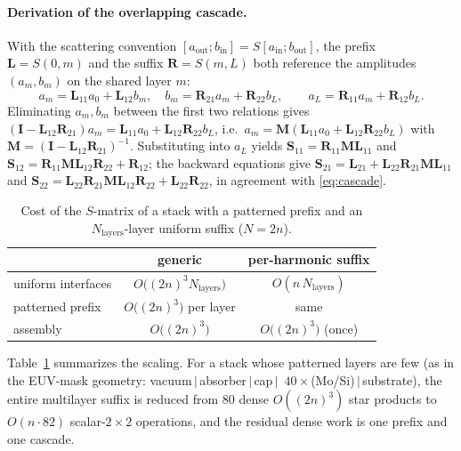 \documentclass[11pt]{article}
\theoremstyle{remark}
\newcommand{\Id}{\mathbf{I}}
\begin{document}
\paragraph{Derivation of the overlapping cascade.}
With the scattering convention $[a_{\mathrm{out}};b_{\mathrm{in}}]=S[a_{\mathrm{in}};b_{\mathrm{out}}]$,
the prefix $\mathbf{L}=S(0,m)$ and the suffix $\mathbf{R}=S(m,L)$ both
reference the amplitudes $(a_m,b_m)$ on the shared layer $m$:
\begin{equation}
a_m=\mathbf{L}_{11}a_0+\mathbf{L}_{12}b_m,\quad
b_m=\mathbf{R}_{21}a_m+\mathbf{R}_{22}b_L,\qquad
a_L=\mathbf{R}_{11}a_m+\mathbf{R}_{12}b_L.
\label{eq:LD}
\end{equation}
Eliminating $a_m,b_m$ between the first two relations gives
$(\Id-\mathbf{L}_{12}\mathbf{R}_{21})a_m=\mathbf{L}_{11}a_0+
\mathbf{L}_{12}\mathbf{R}_{22}b_L$, i.e.\ $a_m=\mathbf{M}(\mathbf{L}_{11}a_0+
\mathbf{L}_{12}\mathbf{R}_{22}b_L)$ with $\mathbf{M}=(\Id-
\mathbf{L}_{12}\mathbf{R}_{21})^{-1}$. Substituting into $a_L$ yields
$\mathbf{S}_{11}=\mathbf{R}_{11}\mathbf{M}\mathbf{L}_{11}$ and
$\mathbf{S}_{12}=\mathbf{R}_{11}\mathbf{M}\mathbf{L}_{12}\mathbf{R}_{22}
+\mathbf{R}_{12}$; the backward equations give
$\mathbf{S}_{21}=\mathbf{L}_{21}+\mathbf{L}_{22}\mathbf{R}_{21}\mathbf{M}\mathbf{L}_{11}$
and $\mathbf{S}_{22}=\mathbf{L}_{22}\mathbf{R}_{21}\mathbf{M}\mathbf{L}_{12}
\mathbf{R}_{22}+\mathbf{L}_{22}\mathbf{R}_{22}$, in agreement with
\eqref{eq:cascade}.

\begin{table}[t]
\centering
\caption{Cost of the $S$-matrix of a stack with a patterned prefix and an
$N_{\mathrm{layers}}$-layer uniform suffix ($N=2n$).}
\label{tab:complexity}
\begin{tabular}{lcc}
\toprule
 & generic & per-harmonic suffix\\
\midrule
uniform interfaces & $O\big((2n)^3 N_{\mathrm{layers}}\big)$ & $O(n\,N_{\mathrm{layers}})$\\
patterned prefix & $O\big((2n)^3\big)$ per layer & same\\
assembly & $O\big((2n)^3\big)$ & $O\big((2n)^3\big)$ (once)\\
\bottomrule
\end{tabular}
\end{table}

Table~\ref{tab:complexity} summarizes the scaling. For a stack whose patterned
layers are few (as in the EUV-mask geometry: vacuum$\,|\,$absorber$\,|\,$cap$\,|\,$
$40\times$(Mo/Si)$\,|\,$substrate), the entire multilayer suffix is reduced from
$80$ dense $O((2n)^3)$ star products to $O(n\cdot 82)$ scalar-$2\times2$
operations, and the residual dense work is one prefix and one cascade.
\end{document}
